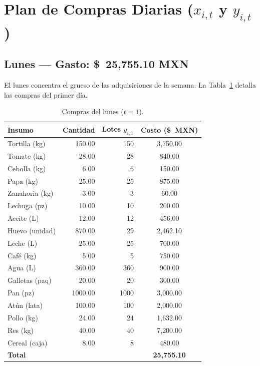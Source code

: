 \documentclass[12pt, a4paper]{article}
\begin{document}
\section{Plan de Compras Diarias ($x_{i,t}$ y $y_{i,t}$)}

\subsection{Lunes — Gasto: \$~25{,}755.10 MXN}

El lunes concentra el grueso de las adquisiciones de la semana.
La Tabla~\ref{tab:compras_lunes} detalla las compras del primer día.

\begin{table}[h!]
\centering
\renewcommand{\arraystretch}{1.25}
\begin{tabular}{lrrc}
\toprule
\textbf{Insumo} & \textbf{Cantidad} & \textbf{Lotes $y_{i,1}$} & \textbf{Costo (\$~MXN)} \\
\midrule
Tortilla (kg)      & 150.00 & 150   & 3{,}750.00 \\
Tomate (kg)        &  28.00 &  28   &    840.00  \\
Cebolla (kg)       &   6.00 &   6   &    150.00  \\
Papa (kg)          &  25.00 &  25   &    875.00  \\
Zanahoria (kg)     &   3.00 &   3   &     60.00  \\
Lechuga (pz)       &  10.00 &  10   &    200.00  \\
Aceite (L)         &  12.00 &  12   &    456.00  \\
Huevo (unidad)     & 870.00 &  29   & 2{,}462.10 \\
Leche (L)          &  25.00 &  25   &    700.00  \\
Café (kg)          &   5.00 &   5   &    750.00  \\
Agua (L)           & 360.00 & 360   &    900.00  \\
Galletas (paq)     &  20.00 &  20   &    300.00  \\
Pan (pz)           & 1000.00 & 1000 & 3{,}000.00 \\
Atún (lata)        & 100.00 & 100   & 2{,}000.00 \\
Pollo (kg)         &  24.00 &  24   & 1{,}632.00 \\
Res (kg)           &  40.00 &  40   & 7{,}200.00 \\
Cereal (caja)      &   8.00 &   8   &    480.00  \\
\midrule
\textbf{Total}     &        &       & \textbf{25{,}755.10} \\
\bottomrule
\end{tabular}
\caption{Compras del lunes ($t = 1$).}
\label{tab:compras_lunes}
\end{table}
\end{document}
